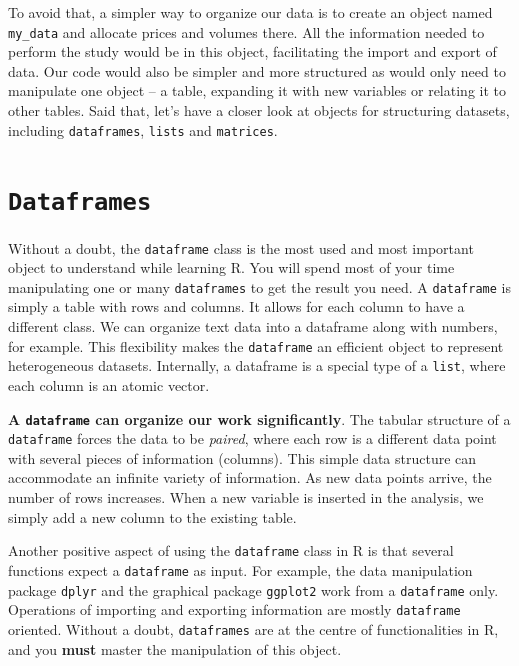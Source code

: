 \documentclass[
  12pt,
]{book}
\begin{document}
To avoid that, a simpler way to organize our data is to create an object named \texttt{my\_data} and allocate prices and volumes there. All the information needed to perform the study would be in this object, facilitating the import and export of data. Our code would also be simpler and more structured as would only need to manipulate one object -- a table, expanding it with new variables or relating it to other tables. Said that, let's have a closer look at objects for structuring datasets, including \texttt{dataframes}, \texttt{lists} and \texttt{matrices}.

\hypertarget{dataframes}{%
\section{\texorpdfstring{\texttt{Dataframes}}{Dataframes}}\label{dataframes}}

Without a doubt, the \texttt{dataframe} class is the most used and most important object to understand while learning R. You will spend most of your time manipulating one or many \texttt{dataframes} to get the result you need. A \texttt{dataframe} is simply a table with rows and columns. It allows for each column to have a different class. We can organize text data into a dataframe along with numbers, for example. This flexibility makes the \texttt{dataframe} an efficient object to represent heterogeneous datasets. Internally, a dataframe is a special type of a \texttt{list}, where each column is an atomic vector. 

\textbf{A \texttt{dataframe} can organize our work significantly}. The tabular structure of a \texttt{dataframe} forces the data to be \emph{paired}, where each row is a different data point with several pieces of information (columns). This simple data structure can accommodate an infinite variety of information. As new data points arrive, the number of rows increases. When a new variable is inserted in the analysis, we simply add a new column to the existing table.

Another positive aspect of using the \texttt{dataframe} class in R is that several functions expect a \texttt{dataframe} as input. For example, the data manipulation package \texttt{dplyr} \citep{R-dplyr} and the graphical package \texttt{ggplot2} \citep{R-ggplot2} work from a \texttt{dataframe} only. Operations of importing and exporting information are mostly \texttt{dataframe} oriented. Without a doubt, \texttt{dataframes} are at the centre of functionalities in R, and you \textbf{must} master the manipulation of this object.
\end{document}
